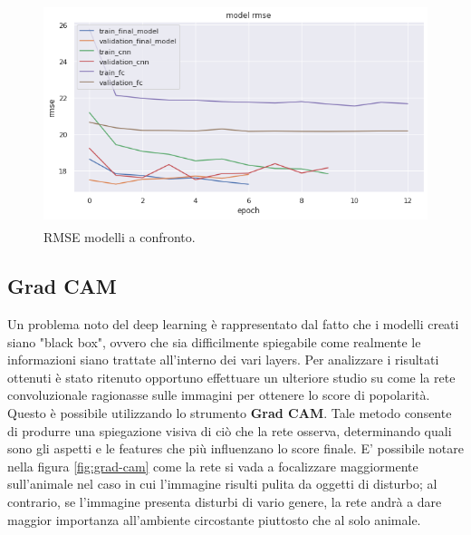 \vspace{1cm}

\begin{figure}[h]
    \centering
    \includegraphics[width=13cm, height=6.5cm]{Plot/ALL_RMSE.png}
    \caption{RMSE modelli a confronto.}
    \label{fig:rmse-all}
\end{figure}


\subsection{Grad CAM}

Un problema noto del deep learning è rappresentato dal fatto che i modelli creati siano "black box", ovvero che sia difficilmente spiegabile come realmente le informazioni siano trattate all'interno dei vari layers. Per analizzare i risultati ottenuti è stato ritenuto opportuno effettuare un ulteriore studio su come la rete convoluzionale ragionasse sulle immagini per ottenere lo score di popolarità. Questo è possibile utilizzando lo strumento \textbf{Grad CAM}\cite{2019}. Tale metodo consente di produrre una spiegazione visiva di ciò che la rete osserva, determinando quali sono gli aspetti e le features che più influenzano lo score finale. E' possibile notare nella figura \ref{fig:grad-cam} come la rete si vada a focalizzare maggiormente sull'animale nel caso in cui l'immagine risulti pulita da oggetti di disturbo; al contrario, se l'immagine presenta disturbi di vario genere, la rete andrà a dare maggior importanza all'ambiente circostante piuttosto che al solo animale.

\vspace{1cm}

